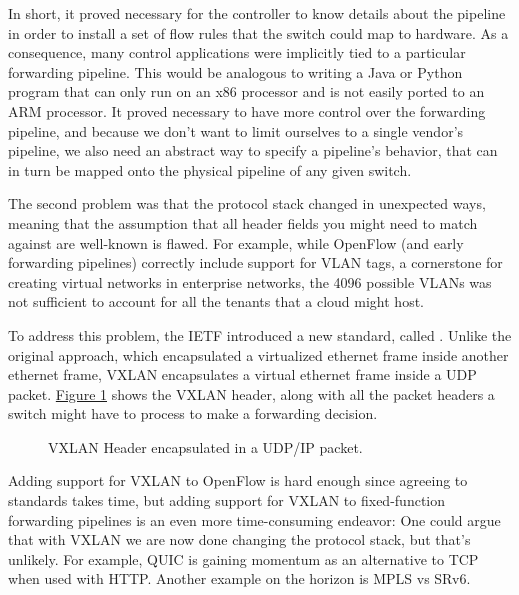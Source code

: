 \documentclass[letterpaper,11pt,english]{sphinxmanual}
\let\sphinxpxdimen\pdfpxdimen\else\newdimen\sphinxpxdimen
\begin{document}
In short, it proved necessary for the controller to know details about
the pipeline in order to install a set of flow rules that the switch could
map to hardware. As a consequence, many control applications were
implicitly tied to a particular forwarding pipeline.  This would be
analogous to writing a Java or Python program that can only run on an
x86 processor and is not easily ported to an ARM processor. It proved
necessary to have more control over the forwarding pipeline, and
because we don’t want to limit ourselves to a single vendor’s
pipeline, we also need an abstract way to specify a pipeline’s
behavior, that can in turn be mapped onto the physical pipeline of any
given switch.

The second problem was that the protocol stack changed in unexpected
ways, meaning that the assumption that all header fields you might
need to match against are well-known is flawed. For example, while
OpenFlow (and early forwarding pipelines) correctly include support
for VLAN tags, a cornerstone for creating virtual networks in
enterprise networks, the 4096 possible VLANs was not sufficient to
account for all the tenants that a cloud might host.

To address this problem, the IETF introduced a new standard, called
. Unlike the original approach, which
encapsulated a virtualized ethernet frame inside another ethernet
frame, VXLAN encapsulates a virtual ethernet frame inside a UDP
packet. \hyperref[\detokenize{intro:fig-vxlan}]{Figure \ref{\detokenize{intro:fig-vxlan}}} shows the VXLAN header, along
with all the packet headers a switch might have to process to make a
forwarding decision.

\begin{figure}[htbp]
\centering
\capstart

\noindent\sphinxincludegraphics[width=500\sphinxpxdimen]{{Slide7}.png}
\caption{VXLAN Header encapsulated in a UDP/IP packet.}\label{\detokenize{intro:id16}}\label{\detokenize{intro:fig-vxlan}}\end{figure}

Adding support for VXLAN to OpenFlow is hard enough since agreeing to
standards takes time, but adding support for VXLAN to fixed-function
forwarding pipelines is an even more time-consuming endeavor:
 One could argue that with VXLAN we are now
done changing the protocol stack, but that’s unlikely. For example,
QUIC is gaining momentum as an alternative to TCP when used with HTTP.
Another example on the horizon is MPLS vs SRv6.
\end{document}
